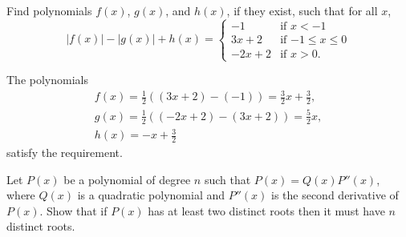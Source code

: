 
\begin{prob}[Putnam 1999, A1]
Find polynomials $f(x)$, $g(x)$, and $h(x)$, if they exist, such that for all $x$,
\[
|f(x)|-|g(x)|+h(x) = \begin{cases} -1 & \mbox{if $x<-1$} \\
                     3x+2 & \mbox{if $-1 \leq x \leq 0$} \\
                     -2x+2 & \mbox{if $x>0$.}
                     \end{cases}
\]
\end{prob}

\begin{sol}
	The polynomials
	\begin{gather*}
		f(x) = \frac{1}{2} ((3x + 2) - (-1)) = \frac{3}{2}x + \frac{3}{2},\\
		g(x) = \frac{1}{2} ((-2x+2) - (3x+2)) = \frac{5}{2}x, \\
		h(x) = -x + \frac{3}{2}
	\end{gather*}
	satisfy the requirement.
\end{sol}

\newpage
\begin{prob}[Putnam 1999, B2]
	Let $P(x)$ be a polynomial of degree $n$ such that $P(x)=Q(x)P''(x)$, where $Q(x)$ is a quadratic polynomial and $P''(x)$ is the second derivative of $P(x)$.
	Show that if $P(x)$ has at least two distinct roots then it must have $n$ distinct roots.	
\end{prob}

